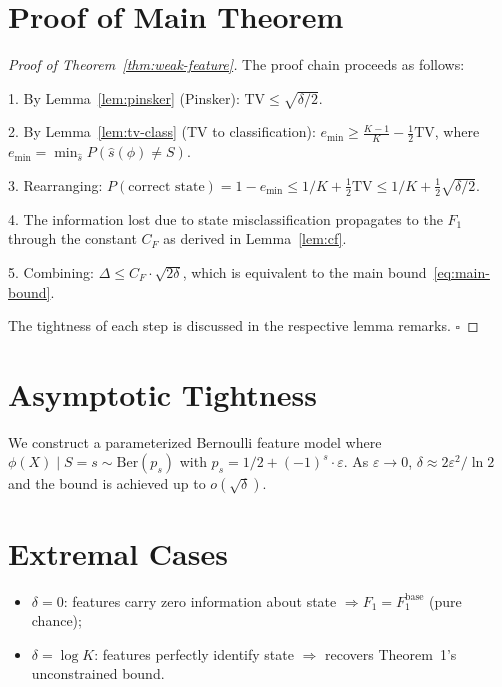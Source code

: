 \documentclass[12pt,a4paper]{article}
\newcommand{\TV}{\mathrm{TV}}
\newcommand{\gap}{\Delta}
\newcommand{\Ber}{\mathrm{Ber}}
\begin{document}
\section{Proof of Main Theorem}
\label{sec:proof-main}

\begin{proof}[Proof of Theorem~\ref{thm:weak-feature}]
The proof chain proceeds as follows:

1. By Lemma~\ref{lem:pinsker} (Pinsker): $\TV \leq \sqrt{\delta/2}$.

2. By Lemma~\ref{lem:tv-class} (TV to classification): $e_{\min} \geq \frac{K-1}{K} - \frac12\TV$, where $e_{\min} = \min_{\hat{s}} P(\hat{s}(\phi) \neq S)$.

3. Rearranging: $P(\text{correct state}) = 1 - e_{\min} \leq 1/K + \frac12\TV \leq 1/K + \frac12\sqrt{\delta/2}$.

4. The information lost due to state misclassification propagates to the $F_1$ through the constant $C_F$ as derived in Lemma~\ref{lem:cf}.

5. Combining: $\gap \leq C_F \cdot \sqrt{2\delta}$, which is equivalent to the main bound~\eqref{eq:main-bound}.

The tightness of each step is discussed in the respective lemma remarks. \hfill$\square$
\end{proof}

\section{Asymptotic Tightness}
\label{sec:tightness}

We construct a parameterized Bernoulli feature model where $\phi(X) \mid S=s \sim \Ber(p_s)$ with $p_s = 1/2 + (-1)^s \cdot \varepsilon$. As $\varepsilon \to 0$, $\delta \approx 2\varepsilon^2/\ln 2$ and the bound is achieved up to $o(\sqrt{\delta})$.

\section{Extremal Cases}
\label{sec:edge-cases}

\begin{itemize}
    \item $\delta = 0$: features carry zero information about state $\Rightarrow F_1 = F_1^{\mathrm{base}}$ (pure chance);
    \item $\delta = \log K$: features perfectly identify state $\Rightarrow$ recovers Theorem~1's unconstrained bound.
\end{itemize}
\end{document}
